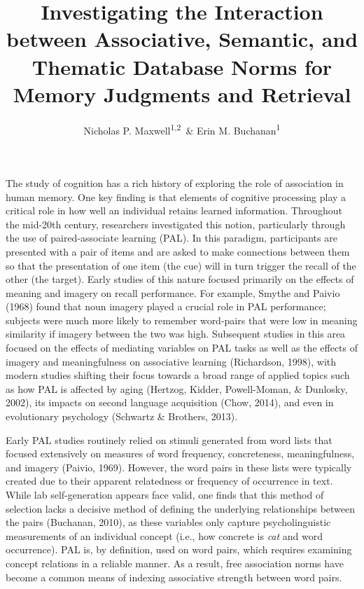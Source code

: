 \documentclass[english,,man]{apa6}
\title{Investigating the Interaction between Associative, Semantic, and
Thematic Database Norms for Memory Judgments and Retrieval}
\author{Nicholas P. Maxwell\textsuperscript{1,2}~\& Erin M.
Buchanan\textsuperscript{1}}
\date{}
\affiliation{
\vspace{0.5cm}
\textsuperscript{1} Missouri State University\\\textsuperscript{2} University of Southern Mississippi}
\begin{document}
\maketitle

The study of cognition has a rich history of exploring the role of
association in human memory. One key finding is that elements of
cognitive processing play a critical role in how well an individual
retains learned information. Throughout the mid-20th century,
researchers investigated this notion, particularly through the use of
paired-associate learning (PAL). In this paradigm, participants are
presented with a pair of items and are asked to make connections between
them so that the presentation of one item (the cue) will in turn trigger
the recall of the other (the target). Early studies of this nature
focused primarily on the effects of meaning and imagery on recall
performance. For example, Smythe and Paivio (1968) found that noun
imagery played a crucial role in PAL performance; subjects were much
more likely to remember word-pairs that were low in meaning similarity
if imagery between the two was high. Subsequent studies in this area
focused on the effects of mediating variables on PAL tasks as well as
the effects of imagery and meaningfulness on associative learning
(Richardson, 1998), with modern studies shifting their focus towards a
broad range of applied topics such as how PAL is affected by aging
(Hertzog, Kidder, Powell-Moman, \& Dunlosky, 2002), its impacts on
second language acquisition (Chow, 2014), and even in evolutionary
psychology (Schwartz \& Brothers, 2013).

Early PAL studies routinely relied on stimuli generated from word lists
that focused extensively on measures of word frequency, concreteness,
meaningfulness, and imagery (Paivio, 1969). However, the word pairs in
these lists were typically created due to their apparent relatedness or
frequency of occurrence in text. While lab self-generation appears face
valid, one finds that this method of selection lacks a decisive method
of defining the underlying relationships between the pairs (Buchanan,
2010), as these variables only capture psycholinguistic measurements of
an individual concept (i.e., how concrete is \emph{cat} and word
occurrence). PAL is, by definition, used on word pairs, which requires
examining concept relations in a reliable manner. As a result, free
association norms have become a common means of indexing associative
strength between word pairs.
\end{document}
